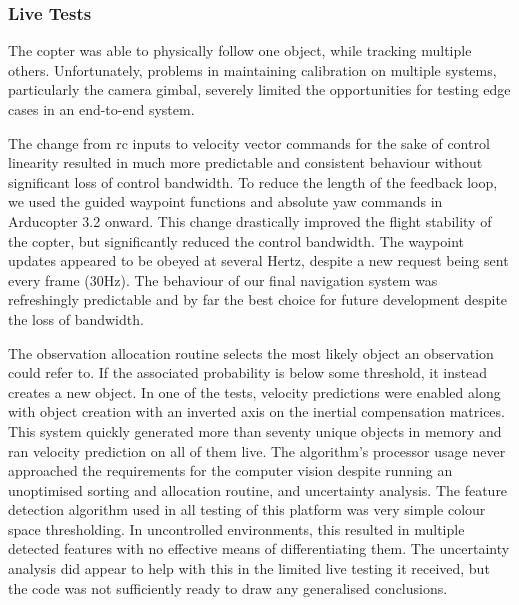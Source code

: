 \documentclass[a4paper, 11pt, titlepage]{article}
\newcounter{subsubsubsection}[subsubsection]
\begin{document}
    \subsubsection{Live Tests}
      The copter was able to physically follow one object, while tracking multiple others.  Unfortunately, problems in maintaining calibration on multiple systems, particularly the camera gimbal, severely limited the opportunities for testing edge cases in an end-to-end system.

        The change from \gls{rc} inputs to velocity vector commands for the sake of control linearity resulted in much more predictable and consistent behaviour without significant loss of control bandwidth.
        To reduce the length of the feedback loop, we used the guided waypoint functions and absolute yaw commands in Arducopter 3.2 onward.  This change drastically improved the flight stability of the copter, but significantly reduced the control bandwidth.  The waypoint updates appeared to be obeyed at several Hertz, despite a new request being sent every frame (30Hz).
        The behaviour of our final navigation system was refreshingly predictable and by far the best choice for future development despite the loss of bandwidth.
      
        The observation allocation routine selects the most likely object an observation could refer to. If the associated probability is below some threshold, it instead creates a new object.
        In one of the tests, velocity predictions were enabled along with object creation with an inverted axis on the inertial compensation matrices. This system quickly generated more than seventy unique objects in memory and ran velocity prediction on all of them live. The algorithm's processor usage never approached the requirements for the computer vision despite running an unoptimised sorting and allocation routine, and uncertainty analysis.
        The feature detection algorithm used in all testing of this platform was very simple colour space thresholding.  In uncontrolled environments, this resulted in multiple detected features with no effective means of differentiating them.  The uncertainty analysis did appear to help with this in the limited live testing it received, but the code was not sufficiently ready to draw any generalised conclusions.
\end{document}
